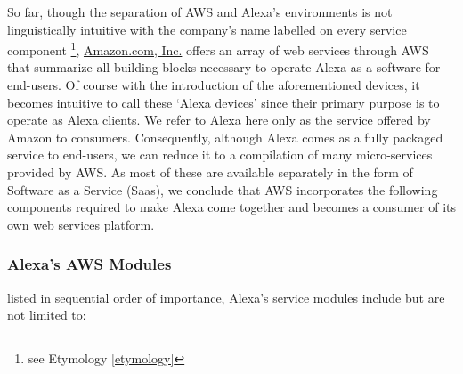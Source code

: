 So far, though the separation of AWS and Alexa's environments is not linguistically intuitive with the company's name labelled on every service component \footnote{see Etymology \ref{etymology}}, \href{http://www.amazon.com}{Amazon.com, Inc.} offers an array of web services through AWS that summarize all building blocks necessary to operate Alexa as a software for end-users. Of course with the introduction of the aforementioned devices, it becomes intuitive to call these `Alexa devices' since their primary purpose is to operate as Alexa clients. We refer to Alexa here only as the service offered by Amazon to consumers. Consequently, although Alexa comes as a fully packaged service to end-users, we can reduce it to a compilation of many micro-services provided by AWS. As most of these are available separately in the form of Software as a Service (Saas), we conclude that AWS incorporates the following components required to make Alexa come together and becomes a consumer of its own web services platform. 

\subsubsection*{Alexa's AWS Modules }

listed in sequential order of importance, Alexa's service modules include but are not limited to: 

